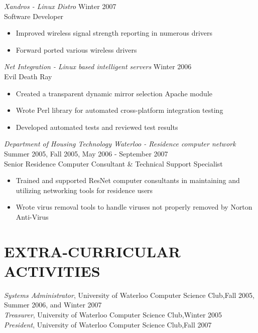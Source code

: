 \documentclass[10pt,line,margin=0.1]{newsres}
\begin{document}
\begin{resume}
        {\sl Xandros - Linux Distro} \hfill Winter 2007 \\
        Software Developer
        \begin{itemize}  \itemsep -2pt %
        \item{Improved wireless signal strength reporting in numerous drivers}
        \item{Forward ported various wireless drivers}
        \end{itemize}
        {\sl Net Integration - Linux based intelligent servers} \hfill Winter 2006 \\
        Evil Death Ray
        \begin{itemize}  \itemsep -2pt %
        \item{Created a transparent dynamic mirror selection Apache module}
        \item{Wrote Perl library for automated cross-platform integration testing}
        \item{Developed automated tests and reviewed test results}
        \end{itemize}
        {\sl Department of Housing Technology Waterloo - Residence computer network} \hfill Summer 2005, Fall 2005, May 2006 - September 2007 \\
        Senior Residence Computer Consultant \& Technical Support Specialist
        \begin{itemize} \itemsep -2pt %
        \item{Trained and supported ResNet computer consultants in maintaining and utilizing networking tools for residence users}
        \item{Wrote virus removal tools to handle viruses not properly removed by Norton Anti-Virus}
        \end{itemize}

 
\section{EXTRA-CURRICULAR \\ ACTIVITIES}             
        {\it Systems Administrator}, University of Waterloo Computer Science Club,\hfill  Fall 2005, Summer 2006, and Winter 2007 \\
        {\it Treasurer}, University of Waterloo Computer Science Club,\hfill Winter 2005 \\
        {\it President}, University of Waterloo Computer Science Club,\hfill Fall 2007 \\


\end{resume}
\end{document}
